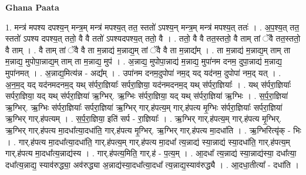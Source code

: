 \documentclass[17pt]{extarticle}
\begin{document}
\textbf{Ghana Paata } \newline

1. मन्त्र॑ मपश्य दपश्य॒न् मन्त्र॒म् मन्त्र॑ मपश्य॒त् तत॒ स्ततो॑ ऽपश्य॒न् मन्त्र॒म् मन्त्र॑ मपश्य॒त् ततः॑ । . अ॒प॒श्य॒त् तत॒ स्ततो॑ ऽपश्य दपश्य॒त् ततो॒ वै वै ततो॑ ऽपश्यदपश्य॒त् ततो॒ वै । . ततो॒ वै वै तत॒स्ततो॒ वै ताम् तां ॅवै तत॒स्ततो॒ वै ताम् । . वै ताम् तां ॅवै वै ता म॒न्नाद्य॑ म॒न्नाद्य॒म् तां ॅवै वै ता म॒न्नाद्य᳚म् । . ता म॒न्नाद्य॑ म॒न्नाद्य॒म् ताम् ता म॒न्नाद्य॒ मुपोपा॒न्नाद्य॒म् ताम् ता म॒न्नाद्य॒ मुप॑ । . अ॒न्नाद्य॒ मुपोपा॒न्नाद्य॑ म॒न्नाद्य॒ मुपा॑नम दनम॒ दुपा॒न्नाद्य॑ म॒न्नाद्य॒ मुपा॑नमत् । . अ॒न्नाद्य॒मित्य॑न्न - अद्य᳚म् । . उपा॑नम दनम॒दुपोपा॑ नम॒द् यद् यद॑नम॒ दुपोपा॑ नम॒द् यत् । . अ॒न॒म॒द् यद् यद॑नमदनम॒द् यथ् स॑र्परा॒ज्ञियाः᳚ सर्परा॒ज्ञिया॒ यद॑नमदनम॒द् यथ् स॑र्परा॒ज्ञियाः᳚ । . यथ् स॑र्परा॒ज्ञियाः᳚ सर्परा॒ज्ञिया॒ यद् यथ् स॑र्परा॒ज्ञिया॑ ऋ॒ग्भिर्. ऋ॒ग्भिः स॑र्परा॒ज्ञिया॒ यद् यथ् स॑र्परा॒ज्ञिया॑ ऋ॒ग्भिः । . स॒र्प॒रा॒ज्ञिया॑ ऋ॒ग्भिर्. ऋ॒ग्भिः स॑र्परा॒ज्ञियाः᳚ सर्परा॒ज्ञिया॑ ऋ॒ग्भिर् गार्.ह॑पत्य॒म् गार्.ह॑पत्य मृ॒ग्भिः स॑र्परा॒ज्ञियाः᳚ सर्परा॒ज्ञिया॑ ऋ॒ग्भिर् गार्.ह॑पत्यम् । . स॒र्प॒रा॒ज्ञिया॒ इति॑ सर्प - रा॒ज्ञियाः᳚ । . ऋ॒ग्भिर् गार्.ह॑पत्य॒म् गार्.ह॑पत्य मृ॒ग्भिर्. ऋ॒ग्भिर् गार्.ह॑पत्य मा॒दधा᳚त्या॒दधा॑ति॒ गार्.ह॑पत्य मृ॒ग्भिर्. ऋ॒ग्भिर् गार्.ह॑पत्य मा॒दधा॑ति । . ऋ॒ग्भिरित्यृ॑क् - भिः । . गार्.ह॑पत्य मा॒दधा᳚त्या॒दधा॑ति॒ गार्.ह॑पत्य॒म् गार्.ह॑पत्य मा॒दधा᳚ त्य॒न्नाद्य॑ स्या॒न्नाद्य॑ स्या॒दधा॑ति॒ गार्.ह॑पत्य॒म् गार्.ह॑पत्य मा॒दधा᳚त्य॒न्नाद्य॑स्य । . गार्.ह॑पत्य॒मिति॒ गार्.ह॑ - प॒त्य॒म् । . आ॒दधा᳚ त्य॒न्नाद्य॑ स्या॒न्नाद्य॑स्या॒ दधा᳚त्या॒ दधा᳚त्य॒न्नाद्य॒ स्याव॑रुद्ध्या॒ अव॑रुद्ध्या अ॒न्नाद्य॑स्या॒दधा᳚त्या॒दधा᳚ त्य॒न्नाद्य॒स्याव॑रुद्ध्यै । . आ॒दधा॒तीत्या᳚ - दधा॑ति । \newline
\end{document}
